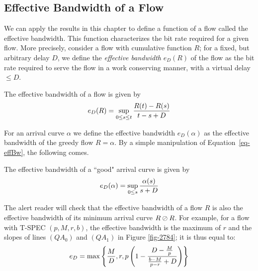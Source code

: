 \subsection{Effective Bandwidth of a Flow}

We can apply the results in this chapter to define a function of a
flow called the effective bandwidth. This function characterizes
the bit rate required for a given flow. More precisely, consider a
flow with cumulative function $R$; for a fixed, but arbitrary
delay $D$, we define the \emph{effective bandwidth} $e_D(R)$ of
the flow as the bit rate required to serve the flow in a work
conserving manner, with a virtual delay $\leq D$.
\begin{proposition}
 The effective bandwidth of a flow is given
by
\begin{equation}
    e_{D}(R) = \sup_{0\leq s \leq t} \frac{R(t)-R(s)}{t-s+D}
    \mylabel{eq-effBw}
\end{equation}
\end{proposition}
For an arrival curve $\alpha$ we define the effective bandwidth
$e_D(\alpha)$ as the effective bandwidth of the greedy flow
$R=\alpha$. By a simple manipulation of Equation~\ref{eq-effBw},
the following comes.
\begin{proposition}
 The effective bandwidth of a ``good"
arrival curve is given by
\begin{equation}
    e_{D}(\alpha) = \sup_{0\leq s } \frac{\alpha(s)}{s+D}
    \mylabel{eq-effBw2}
\end{equation}
\end{proposition}
The alert reader will check that the effective bandwidth of a flow
$R$ is also the effective bandwidth of its minimum arrival curve
$R \oslash R$. For example, for a flow with T-SPEC $(p,M,r,b)$, the
effective bandwidth is the maximum of $r$ and the slopes of lines
$(QA_{0})$ and $(QA_{1})$ in Figure \ref{fig-2784}; it is thus
equal to:
\begin{equation}
    e_{D} = \max \left\{ \frac{M}{D}, r, p \left(1 -
\frac{D-\frac{M}{p}}{\frac{b-M}{p-r}+D}\right) \right\}
    \mylabel{eq-cac2-11}
\end{equation}
\begin{figure}[!htbp]
\end{figure}
